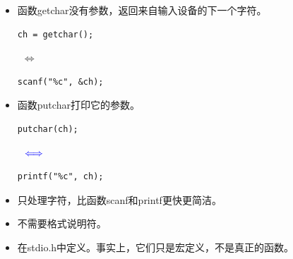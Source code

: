 \begin{frame}[fragile]
\begin{itemize}
\item 
函数getchar没有参数，返回来自输入设备的下一个字符。 \\[0.1in]

\begin{minipage}{0.3\textwidth}
\begin{lstlisting}[backgroundcolor=\color{red!20},]
ch = getchar();
\end{lstlisting} 
\end{minipage}
$~~ \Longleftrightarrow~~$
\begin{minipage}{0.4\textwidth}
\begin{lstlisting}[backgroundcolor=\color{red!20},]
scanf("%c", &ch);
\end{lstlisting} 
\end{minipage} \vspace{0.1in}

\item 
函数putchar打印它的参数。 \\[0.1in]

\begin{minipage}{0.35\textwidth}
\begin{lstlisting}[backgroundcolor=\color{red!20},]
putchar(ch);
\end{lstlisting} 
\end{minipage}
$~~\textcolor{blue} \Longleftrightarrow~~$
\begin{minipage}{0.4\textwidth}
\begin{lstlisting}[backgroundcolor=\color{red!20},]
printf("%c", ch);
\end{lstlisting} 
\end{minipage}
\end{itemize}
\end{frame}

\begin{frame}[fragile]
\begin{itemize}
\item 
只处理字符，比函数scanf和printf更快更简洁。\\[0.1in]
\item
不需要格式说明符。\\[0.1in]
\item
在stdio.h中定义。事实上，它们只是宏定义，不是真正的函数。
\end{itemize}
\end{frame}

